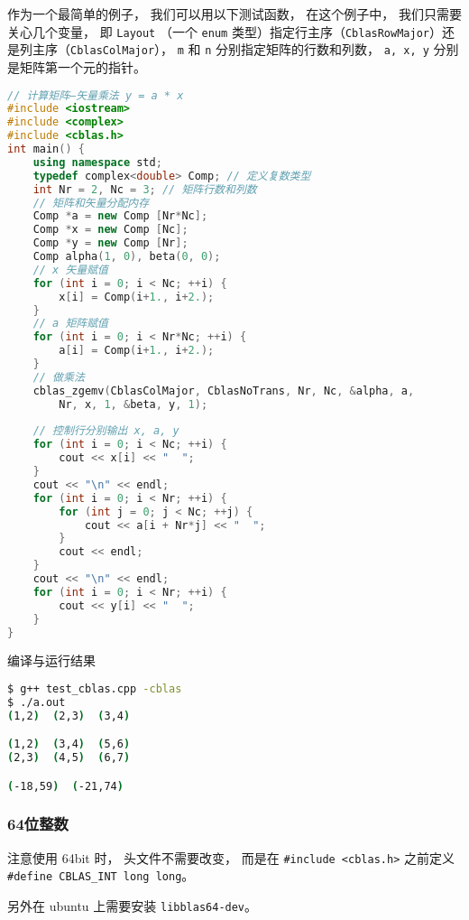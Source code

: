 作为一个最简单的例子， 我们可以用以下测试函数， 在这个例子中， 我们只需要关心几个变量， 即 \verb|Layout| （一个 \verb|enum| 类型）指定行主序（\verb|CblasRowMajor|）还是列主序（\verb|CblasColMajor|）， \verb|m| 和 \verb|n| 分别指定矩阵的行数和列数， \verb|a, x, y| 分别是矩阵第一个元的指针。
\begin{lstlisting}[language=cpp, caption=blas\_demo.cpp]
// 计算矩阵—矢量乘法 y = a * x
#include <iostream>
#include <complex>
#include <cblas.h>
int main() {
    using namespace std;
    typedef complex<double> Comp; // 定义复数类型
    int Nr = 2, Nc = 3; // 矩阵行数和列数
    // 矩阵和矢量分配内存
    Comp *a = new Comp [Nr*Nc];
    Comp *x = new Comp [Nc];
    Comp *y = new Comp [Nr];
    Comp alpha(1, 0), beta(0, 0);
    // x 矢量赋值
    for (int i = 0; i < Nc; ++i) {
        x[i] = Comp(i+1., i+2.);
    }
    // a 矩阵赋值
    for (int i = 0; i < Nr*Nc; ++i) {
        a[i] = Comp(i+1., i+2.);
    }
    // 做乘法
    cblas_zgemv(CblasColMajor, CblasNoTrans, Nr, Nc, &alpha, a,
        Nr, x, 1, &beta, y, 1);
        
    // 控制行分别输出 x, a, y
    for (int i = 0; i < Nc; ++i) {
        cout << x[i] << "  ";
    }
    cout << "\n" << endl;
    for (int i = 0; i < Nr; ++i) {
        for (int j = 0; j < Nc; ++j) {
            cout << a[i + Nr*j] << "  ";
        }
        cout << endl;
    }
    cout << "\n" << endl;
    for (int i = 0; i < Nr; ++i) {
        cout << y[i] << "  ";
    }
}
\end{lstlisting}

编译与运行结果
\begin{lstlisting}[language=bash]
$ g++ test_cblas.cpp -cblas
$ ./a.out
(1,2)  (2,3)  (3,4)

(1,2)  (3,4)  (5,6)
(2,3)  (4,5)  (6,7)

(-18,59)  (-21,74)
\end{lstlisting}

\subsubsection{64位整数}
注意使用 64bit 时， 头文件不需要改变， 而是在 \verb|#include <cblas.h>| 之前定义 \verb|#define CBLAS_INT long long|。

另外在 ubuntu 上需要安装 \verb|libblas64-dev|。

